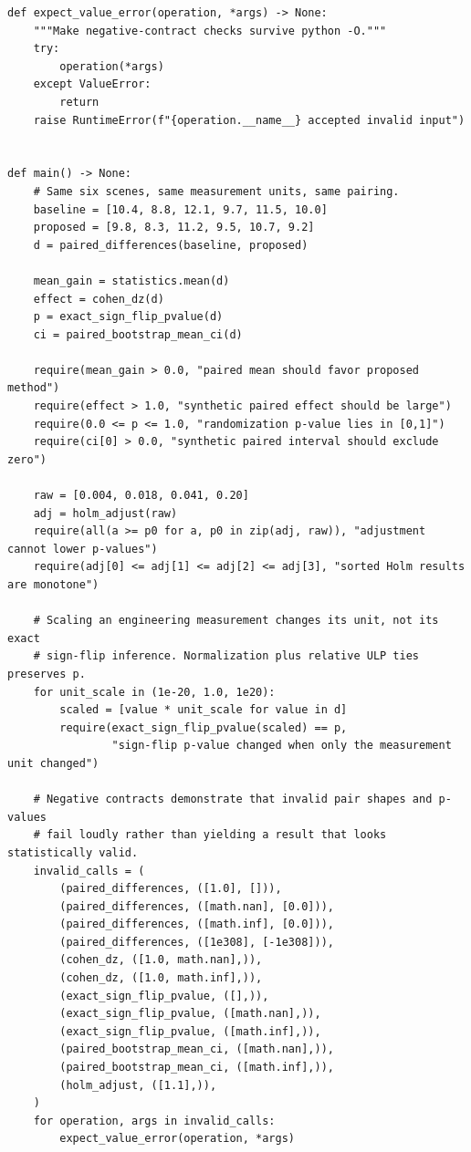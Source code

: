 \begin{verbatim}
def expect_value_error(operation, *args) -> None:
    """Make negative-contract checks survive python -O."""
    try:
        operation(*args)
    except ValueError:
        return
    raise RuntimeError(f"{operation.__name__} accepted invalid input")


def main() -> None:
    # Same six scenes, same measurement units, same pairing.
    baseline = [10.4, 8.8, 12.1, 9.7, 11.5, 10.0]
    proposed = [9.8, 8.3, 11.2, 9.5, 10.7, 9.2]
    d = paired_differences(baseline, proposed)

    mean_gain = statistics.mean(d)
    effect = cohen_dz(d)
    p = exact_sign_flip_pvalue(d)
    ci = paired_bootstrap_mean_ci(d)

    require(mean_gain > 0.0, "paired mean should favor proposed method")
    require(effect > 1.0, "synthetic paired effect should be large")
    require(0.0 <= p <= 1.0, "randomization p-value lies in [0,1]")
    require(ci[0] > 0.0, "synthetic paired interval should exclude zero")

    raw = [0.004, 0.018, 0.041, 0.20]
    adj = holm_adjust(raw)
    require(all(a >= p0 for a, p0 in zip(adj, raw)), "adjustment cannot lower p-values")
    require(adj[0] <= adj[1] <= adj[2] <= adj[3], "sorted Holm results are monotone")

    # Scaling an engineering measurement changes its unit, not its exact
    # sign-flip inference. Normalization plus relative ULP ties preserves p.
    for unit_scale in (1e-20, 1.0, 1e20):
        scaled = [value * unit_scale for value in d]
        require(exact_sign_flip_pvalue(scaled) == p,
                "sign-flip p-value changed when only the measurement unit changed")

    # Negative contracts demonstrate that invalid pair shapes and p-values
    # fail loudly rather than yielding a result that looks statistically valid.
    invalid_calls = (
        (paired_differences, ([1.0], [])),
        (paired_differences, ([math.nan], [0.0])),
        (paired_differences, ([math.inf], [0.0])),
        (paired_differences, ([1e308], [-1e308])),
        (cohen_dz, ([1.0, math.nan],)),
        (cohen_dz, ([1.0, math.inf],)),
        (exact_sign_flip_pvalue, ([],)),
        (exact_sign_flip_pvalue, ([math.nan],)),
        (exact_sign_flip_pvalue, ([math.inf],)),
        (paired_bootstrap_mean_ci, ([math.nan],)),
        (paired_bootstrap_mean_ci, ([math.inf],)),
        (holm_adjust, ([1.1],)),
    )
    for operation, args in invalid_calls:
        expect_value_error(operation, *args)


\end{verbatim}
